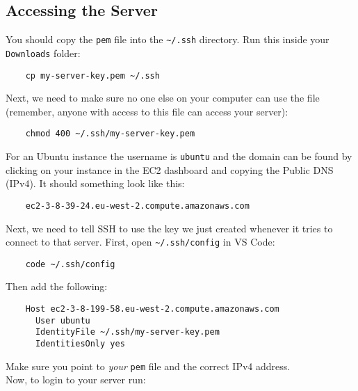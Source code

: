


\subsection{Accessing the Server}

You should copy the \texttt{pem} file into the \texttt{\textasciitilde/.ssh} directory. Run this inside your \texttt{Downloads} folder:

\begin{verbatim}
    cp my-server-key.pem ~/.ssh
\end{verbatim}

Next, we need to make sure no one else on your computer can use the file (remember, anyone with access to this file can access your server):

\begin{verbatim}
    chmod 400 ~/.ssh/my-server-key.pem
\end{verbatim}

For an Ubuntu instance the username is \texttt{ubuntu} and the domain can be found by clicking on your instance in the EC2 dashboard and copying the Public DNS (IPv4). It should something look like this:

\begin{verbatim}
    ec2-3-8-39-24.eu-west-2.compute.amazonaws.com
\end{verbatim}

Next, we need to tell SSH to use the key we just created whenever it tries to connect to that server. First, open \texttt{\textasciitilde/.ssh/config} in VS Code:

\begin{verbatim}
    code ~/.ssh/config
\end{verbatim}

Then add the following:

\begin{verbatim}
    Host ec2-3-8-199-58.eu-west-2.compute.amazonaws.com
      User ubuntu
      IdentityFile ~/.ssh/my-server-key.pem
      IdentitiesOnly yes
\end{verbatim}

Make sure you point to \textit{your} \texttt{pem} file and the correct IPv4 address.
\\

Now, to login to your server run:


